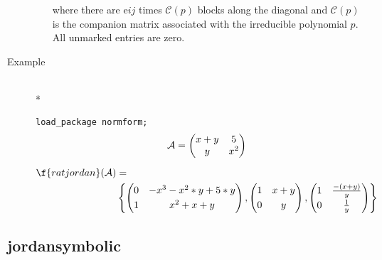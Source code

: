 \begin{description}
\begin{itemize}
      where there are e${ij}$ times $\mathcal{C}(p)$ blocks 
      along the diagonal and $\mathcal{C}(p)$ is the companion 
      matrix  associated with the irreducible polynomial $p$. All 
      unmarked entries are zero.
\end{itemize}

\item[Example]\mbox{}\\*

\texttt{load\_package normform;}
\begin{gather*}
\mathcal{A} = \begin{pmatrix} x+y & 5 \\ y & x^2  \end{pmatrix} \\[2mm]
\begin{split}
\f{ratjordan}(\mathcal{A}) &= \\ 
& \left\{
    \begin{pmatrix} 0 & -x^3-x^2*y+5*y \\[1mm] 1 & x^2+x+y \end{pmatrix},
    \begin{pmatrix} 1 & x+y \\[1mm] 0 & y \end{pmatrix},
    \begin{pmatrix} 1 & \frac{-(x+y)}{y} \\[1mm] 0 &  \frac{1}{y} \end{pmatrix} 
  \right\}
\end{split}
\end{gather*}
\end{description}

\subsection{jordansymbolic}

